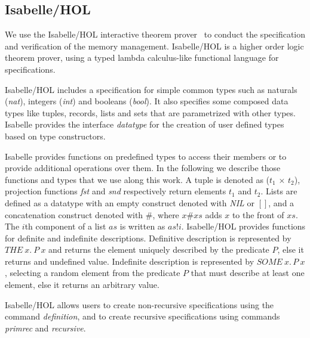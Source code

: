 \subsection{Isabelle/HOL}
We use the Isabelle/HOL interactive theorem prover~\cite{reg_Isabelle/HOL} to conduct the specification and verification of the memory management. Isabelle/HOL is a higher order logic theorem prover, using a typed lambda calculus-like functional language for specifications.

Isabelle/HOL includes a specification for simple common types such as naturals (\emph{nat}), integers (\emph{int}) and booleans (\emph{bool}). It also specifies some composed data types like tuples, records, lists and sets that are parametrized with other types. Isabelle provides the interface \emph{datatype} for the creation of user defined types based on type constructors.

Isabelle provides functions on predefined types to access their members or to provide additional operations over them. In the following we describe those functions and types that we use along this work. A tuple is denoted as (\emph{$t_1$} $\times$ \emph{$t_2$}), projection functions \emph{fst} and \emph{snd} respectively return elements $t_1$ and $t_2$. Lists are defined as a datatype with an empty construct denoted with \emph{NIL} or $[]$, and a concatenation construct denoted with $\#$, where $x\#xs$ adds $x$ to the front of $xs$. The $i$th component of a list $as$ is written as $as!i$. Isabelle/HOL provides functions for definite and indefinite descriptions. Definitive description is represented by $THE\ x.\ P\ x$ and returns the element uniquely described by the predicate $P$, else it returns and undefined value. Indefinite description is represented by $SOME\ x.\, P\ x$, selecting a random element from the predicate $P$ that must describe at least one element, else it returns an arbitrary value.

Isabelle/HOL allows users to create non-recursive specifications using the command \emph{definition}, and to create recursive specifications using commands \emph{primrec} and \emph{recursive}.
